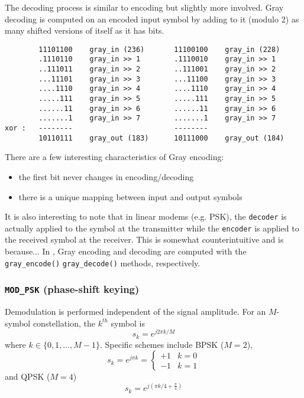 The decoding process is similar to encoding but slightly more involved.
Gray decoding is computed on an encoded input symbol
by adding to it (modulo 2) as many shifted versions of itself as it has bits.
\begin{verbatim}
        11101100    gray_in (236)       11100100    gray_in (228)
        .1110110    gray_in >> 1        .1110010    gray_in >> 1
        ..111011    gray_in >> 2        ..111001    gray_in >> 2
        ...11101    gray_in >> 3        ...11100    gray_in >> 3
        ....1110    gray_in >> 4        ....1110    gray_in >> 4
        .....111    gray_in >> 5        .....111    gray_in >> 5
        ......11    gray_in >> 6        ......11    gray_in >> 6
        .......1    gray_in >> 7        .......1    gray_in >> 7
xor :   --------                        --------
        10110111    gray_out (183)      10111000    gray_out (184)
\end{verbatim}
There are a few interesting characteristics of Gray encoding:
\begin{itemize}
\item the first bit never changes in encoding/decoding
\item there is a unique mapping between input and output symbols
\end{itemize}
It is also interesting to note that in linear modems (e.g. PSK), the
{\tt decoder} is actually applied to the symbol at the transmitter while the
{\tt encoder} is applied to the received symbol at the receiver.
This is somewhat counterintuitive and is because...
In \liquid, Gray encoding and decoding are computed with the
{\tt gray\_encode()} {\tt gray\_decode()} methods, respectively.

\subsubsection{{\tt MOD\_PSK} (phase-shift keying)}
Demodulation is performed independent of the signal amplitude.
For an $M$-symbol constellation, the $k^{th}$ symbol is
\[
    s_k = e^{j 2 \pi k/M}
\]
where $k \in \{0,1,\ldots,M-1\}$.
Specific schemes include BPSK ($M=2$),
\[
    s_k = e^{j \pi k} =
    \begin{cases}
        +1 & k=0 \\
        -1 & k=1
    \end{cases}
\]
and QPSK ($M=4$)
\[
    s_k = e^{j\left(\pi k/4 + \frac{\pi}{4}\right)}
\]

